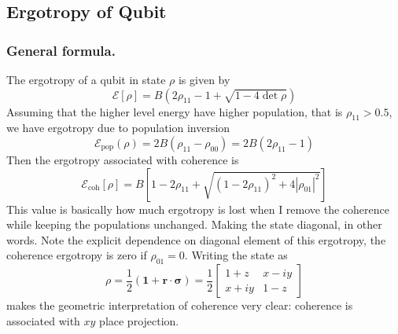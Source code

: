 \documentclass[../../../main.tex]{subfiles}
\begin{document}
\subsection{Ergotropy of Qubit}

\subsubsection{General formula.}
The ergotropy of a qubit in state $\rho$ is given by
\begin{equation*}
  \mathcal{E} [\rho]
  = B(2\rho_{11}- 1 + \sqrt{1-4 \det \rho})
\end{equation*}
Assuming that the higher level energy have higher population, that is $\rho_{11}>0.5$, we have ergotropy due to population inversion
\begin{equation*}
  \mathcal{E}_\text{pop}(\rho)
  = 2B(\rho_{11}-\rho_{00}) = 2B(2\rho_{11}-1)
\end{equation*}
Then the ergotropy associated with coherence is
\begin{equation*}
  \mathcal{E}_\text{coh}[\rho]
  = B \left[  1 - 2 \rho_{11} + \sqrt{(1-2\rho_{11})^2+ 4|\rho_{01}|^2}  \right]
\end{equation*}
This value is basically how much ergotropy is lost when I remove the coherence while keeping the populations unchanged.
Making the state diagonal, in other words.
Note the explicit dependence on diagonal element of this ergotropy, the coherence ergotropy is zero if $\rho_{01}=0$.
Writing the state as
\begin{equation*}
  \rho
  =
  \frac12\left(\mathbf{1}+\mathbf r\cdot\boldsymbol{\sigma}\right)
  =
  \frac12
  \begin{bmatrix}
    1+z  & x-iy \\
    x+iy & 1-z
  \end{bmatrix}
\end{equation*}
makes the geometric interpretation of coherence very clear: coherence is associated with $xy$ place projection.
\end{document}
